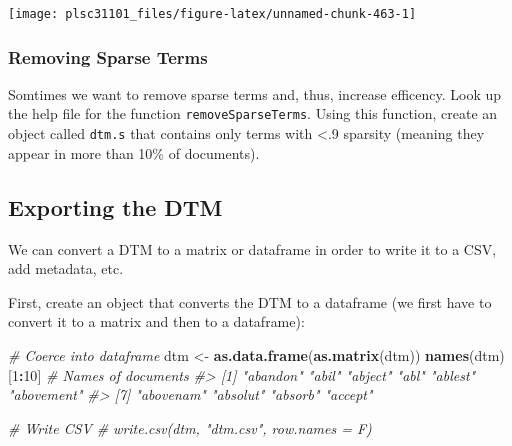 \documentclass[
]{book}
\newenvironment{Shaded}{\begin{snugshade}}{\end{snugshade}}
\newcommand{\CommentTok}[1]{\textcolor[rgb]{0.56,0.35,0.01}{\textit{#1}}}
\newcommand{\DecValTok}[1]{\textcolor[rgb]{0.00,0.00,0.81}{#1}}
\newcommand{\KeywordTok}[1]{\textcolor[rgb]{0.13,0.29,0.53}{\textbf{#1}}}
\newcommand{\NormalTok}[1]{#1}
\newcommand{\OperatorTok}[1]{\textcolor[rgb]{0.81,0.36,0.00}{\textbf{#1}}}
\newcommand{\StringTok}[1]{\textcolor[rgb]{0.31,0.60,0.02}{#1}}
\begin{document}
\begin{center}\texttt{[image: plsc31101\_files/figure-latex/unnamed-chunk-463-1]} \end{center}

\hypertarget{removing-sparse-terms}{%
\subsubsection*{Removing Sparse Terms}\label{removing-sparse-terms}}

Somtimes we want to remove sparse terms and, thus, increase efficency. Look up the help file for the function \texttt{removeSparseTerms}. Using this function, create an object called \texttt{dtm.s} that contains only terms with \textless.9 sparsity (meaning they appear in more than 10\% of documents).

\begin{Shaded}
\end{Shaded}

\hypertarget{exporting-the-dtm}{%
\subsection{Exporting the DTM}\label{exporting-the-dtm}}

We can convert a DTM to a matrix or dataframe in order to write it to a CSV, add metadata, etc.

First, create an object that converts the DTM to a dataframe (we first have to convert it to a matrix and then to a dataframe):

\begin{Shaded}
\begin{Highlighting}[]
\CommentTok{# Coerce into dataframe}
\NormalTok{dtm <-}\StringTok{ }\KeywordTok{as.data.frame}\NormalTok{(}\KeywordTok{as.matrix}\NormalTok{(dtm))}
\KeywordTok{names}\NormalTok{(dtm)[}\DecValTok{1}\OperatorTok{:}\DecValTok{10}\NormalTok{]  }\CommentTok{# Names of documents}
\CommentTok{#>  [1] "abandon"   "abil"      "abject"    "abl"       "ablest"    "abovement"}
\CommentTok{#>  [7] "abovenam"  "absolut"   "absorb"    "accept"}

\CommentTok{# Write CSV}
\CommentTok{# write.csv(dtm, "dtm.csv", row.names = F)}
\end{Highlighting}
\end{Shaded}
\end{document}
